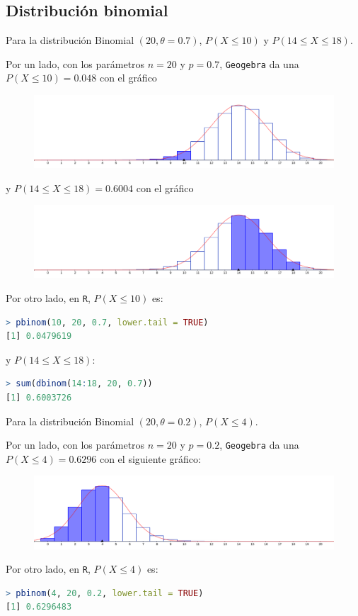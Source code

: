 \subsection{Distribución binomial}
\begin{ejer}[1]
	Para la distribución Binomial $(20, \theta = 0.7)$, $P(X \leq 10)$ y $P(14 \leq X \leq 18)$.
\end{ejer}
\begin{sol}
	Por un lado, con los parámetros $n=20$ y $p=0.7$, \texttt{Geogebra} da una $P(X\leq 10) = 0.048$ con el gráfico
	\begin{figure}[H]
		\includegraphics[width=0.5\linewidth]{pics/g2-1}
		\centering
	\end{figure}\noindent
%
	y $P(14 \leq X \leq 18) = 0.6004$ con el gráfico 
	\begin{figure}[H]
		\includegraphics[width=0.5\linewidth]{pics/g2-2} 
		\centering
	\end{figure}\noindent
	Por otro lado, en \texttt{R}, $P(X\leq 10)$ es:
	\begin{lstlisting}[language=R]
> pbinom(10, 20, 0.7, lower.tail = TRUE)
[1] 0.0479619
	\end{lstlisting}
	y $P(14 \leq X \leq 18)$:
	\begin{lstlisting}[language=R]
> sum(dbinom(14:18, 20, 0.7))
[1] 0.6003726
	\end{lstlisting}
\end{sol}
\begin{ejer}[0,5]
	 Para la distribución Binomial $(20, \theta = 0.2)$, $P(X \leq 4)$.
\end{ejer}
\begin{sol}
	Por un lado, con los parámetros $n=20$ y $p=0.2$, \texttt{Geogebra} da una $P(X\leq 4) = 0.6296$ con el siguiente gráfico:
		\begin{figure}[H]
		\includegraphics[width=0.5\linewidth]{pics/g3}
		\centering
		\end{figure}\noindent
	Por otro lado, en \texttt{R}, $P(X\leq 4)$ es:
	\begin{lstlisting}[language=R]
> pbinom(4, 20, 0.2, lower.tail = TRUE)
[1] 0.6296483
	\end{lstlisting}
\end{sol}
